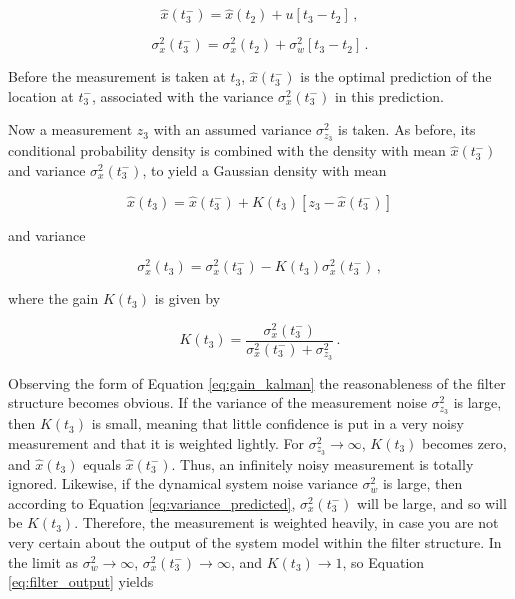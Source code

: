 \begin{equation}\label{eq:system_model}
  \hat{x}(t^-_3)=\hat{x}(t_2)+u[t_3-t_2]\,,
\end{equation}

\begin{equation}\label{eq:variance_predicted}
  \sigma^2_x(t^-_3)=\sigma^2_x(t_2)+\sigma^2_w[t_3-t_2]\,.
\end{equation}

\noindent
Before the measurement is taken at $t_3$, $\hat{x}(t^-_3)$ is the optimal prediction of the location at $t^-_3$, associated with the variance $\sigma^2_x(t^-_3)$ in this prediction.

Now a measurement $z_3$ with an assumed variance $\sigma^2_{z_3}$ is taken. As before, its conditional probability density is combined with the density with mean $\hat{x}(t^-_3)$ and variance $\sigma^2_x(t^-_3)$, to yield a Gaussian density with mean

\begin{equation}\label{eq:estimation_kalman}
  \hat{x}(t_3) = \hat{x}(t^-_3) + K(t_3)[z_3-\hat{x}(t^-_3)]
\end{equation}

\noindent
and variance

\begin{equation}\label{eq:variance_kalman}
  \sigma^2_x(t_3) = \sigma^2_x(t^-_3)-K(t_3)\sigma^2_x(t^-_3)\,,
\end{equation}

\noindent
where the gain $K(t_3)$ is given by

\begin{equation}\label{eq:gain_kalman}
  K(t_3) = \frac{\sigma^2_x(t^-_3)}{\sigma^2_x(t^-_3)+\sigma^2_{z_3}}\,.
\end{equation}

Observing the form of Equation \ref{eq:gain_kalman} the reasonableness of the filter structure becomes obvious. If the variance of the measurement noise $\sigma^2_{z_3}$ is large, then $K(t_3)$ is small, meaning that little confidence is put in a very noisy measurement and that it is weighted lightly. For $\sigma^2_{z_3}\rightarrow\infty$, $K(t_3)$ becomes zero, and $\hat{x}(t_3)$ equals $\hat{x}(t^-_3)$. Thus, an infinitely noisy measurement is totally ignored. Likewise, if the dynamical system noise variance $\sigma^2_w$ is large, then according to Equation \ref{eq:variance_predicted}, $\sigma^2_x(t^-_3)$ will be large, and so will be $K(t_3)$. Therefore, the measurement is weighted heavily, in case you are not very certain about the output of the system model within the filter structure. In the limit as $\sigma^2_w \rightarrow\infty$, $\sigma^2_x(t^-_3) \rightarrow\infty$, and $K(t_3) \rightarrow1$, so Equation \ref{eq:filter_output} yields

